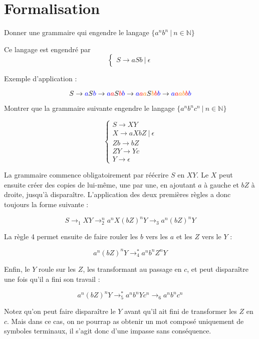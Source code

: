  
 \section{Formalisation}
 

\begin{exercice}
Donner une grammaire qui engendre le langage $\{a^nb^n ~|~ n \in \mathbb{N}\}$
\end{exercice}

\begin{correction*}

Ce langage est engendré par 
\[
\begin{cases}
S \rightarrow aSb ~|~ \epsilon 
\end{cases}
\]

Exemple d'application :

\[
S \rightarrow \textcolor{blue}{a}S\textcolor{blue}{b} \rightarrow \textcolor{blue}{a}\textcolor{red}{a}S\textcolor{red}{b}\textcolor{blue}{b} \rightarrow \textcolor{blue}{a}\textcolor{red}{a}\textcolor{orange}{a}S\textcolor{orange}{b}\textcolor{red}{b}\textcolor{blue}{b} \rightarrow \textcolor{blue}{a}\textcolor{red}{a}\textcolor{orange}{a}\textcolor{orange}{b}\textcolor{red}{b}\textcolor{blue}{b} 
\]

\end{correction*}

\begin{exercice}
\label{grammanbncn}
Montrer que la grammaire suivante engendre le langage $\{a^nb^nc^n ~|~ n \in \mathbb{N}\}$

\[
\begin{cases}
S \rightarrow XY \\
X \rightarrow aXbZ~|~\epsilon\\
Zb \rightarrow bZ \\
ZY \rightarrow Yc \\
Y \rightarrow \epsilon
\end{cases}
\]
\end{exercice}

\begin{correction*}
La grammaire commence obligatoirement par réécrire $S$ en $XY$. Le $X$ peut ensuite créer des copies de lui-même, une par une, en ajoutant $a$ à gauche et $bZ$ à droite, jusqu'à disparaître. L'application des deux premières règles a donc toujours la forme suivante :

\[
S \rightarrow_1 XY \rightarrow_2^n a^nX(bZ)^nY \rightarrow_3 a^n(bZ)^nY
\]

La règle 4 permet ensuite de faire rouler les $b$ vers les $a$ et les $Z$ vers le $Y$ : 

\[
a^n(bZ)^nY \rightarrow_4^* a^nb^nZ^nY
\]

Enfin, le $Y$ roule sur les $Z$, les transformant au passage en $c$, et peut disparaître une fois qu'il a fini son travail :


\[
a^n(bZ)^nY \rightarrow_5^* a^nb^nYc^n \rightarrow_6 a^nb^nc^n
\]

Notez qu'on peut faire disparaître le $Y$ avant qu'il ait fini de transformer les $Z$ en $c$. Mais dans ce cas, on ne pourrap as obtenir un mot composé uniquement de symboles terminaux, il s'agit donc d'une impasse sans conséquence.
\end{correction*}


